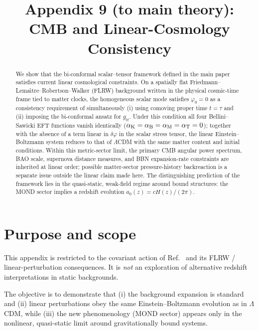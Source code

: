 \documentclass[11pt]{article}
\title{Appendix 9 (to main theory): CMB and Linear-Cosmology Consistency}
\author{}
\date{}
\newcommand{\aB}{\alpha_{\rm B}}
\newcommand{\aK}{\alpha_{\rm K}}
\newcommand{\aM}{\alpha_{\rm M}}
\newcommand{\aT}{\alpha_{\rm T}}
\newcommand{\azero}{a_0}
\newcommand{\LCDM}{$\Lambda$CDM}
\begin{document}
\let\phi\varphi
\maketitle

\begin{abstract}
We show that the bi-conformal scalar--tensor framework defined in the main paper \cite{Lotishvili2026} satisfies current linear cosmological constraints.
On a spatially flat Friedmann--Lema\^{\i}tre--Robertson--Walker (FLRW) background
written in the physical cosmic-time frame tied to matter clocks, the homogeneous
scalar mode satisfies $\phi_0=0$ as a consistency requirement of simultaneously
(i) using comoving proper time $t=\tau$ and (ii) imposing the bi-conformal ansatz
for $g_{tt}$. Under this condition all four Bellini--Sawicki EFT functions vanish
identically ($\aK=\aB=\aM=\aT=0$); together with the absence of a term linear in
$\delta\phi$ in the scalar stress tensor, the linear Einstein--Boltzmann system
reduces to that of \LCDM{} with the same matter content and initial conditions. Within this
metric-sector limit, the primary CMB angular power spectrum, BAO scale, supernova
distance measures, and BBN expansion-rate constraints are inherited at linear order;
possible matter-sector pressure-history backreaction is a separate issue outside
the linear claim made here. The distinguishing
prediction of the framework lies in the quasi-static, weak-field regime around
bound structures: the MOND sector implies a redshift evolution
$\azero(z)=cH(z)/(2\pi)$.
\end{abstract}

\section{Purpose and scope}
\label{sec:scope}

This appendix is restricted to the covariant action of Ref.~\cite{Lotishvili2026}
and its FLRW / linear-perturbation consequences. It is \emph{not} an exploration
of alternative redshift interpretations in static backgrounds.

The objective is to demonstrate that (i) the background expansion is standard
and (ii) linear perturbations obey the same Einstein--Boltzmann evolution as in
\LCDM{}, while (iii) the new phenomenology (MOND sector) appears only in the
nonlinear, quasi-static limit around gravitationally bound systems.
\end{document}
